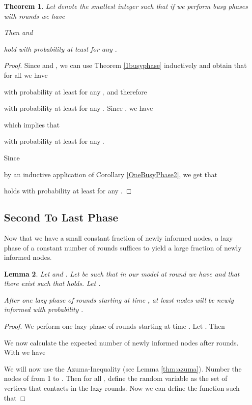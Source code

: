 \documentclass[12pt]{article}
\newtheorem{theorem}{Theorem}
\newtheorem{lemma}[theorem]{Lemma}
\begin{document}
{\begin{theorem}
Let  denote the smallest integer such that if we perform  busy phases with  rounds we have 

Then 
and

hold with probability at least  for any .
\end{theorem}

\begin{proof} 
Since  and , we can use Theorem \ref{1busyphase} inductively and obtain that for all  we have


with probability at least  for any , and therefore


with probability at least  for any .
Since , we have

which implies that

with probability at least  for any .

Since

by an inductive application of Corollary \ref{OneBusyPhase2}, we get that 

holds with probability at least  for any .
\end{proof}



\subsection{Second To Last Phase}

Now that we have a small constant fraction of newly informed nodes, a lazy phase of a constant number of rounds suffices to yield a large fraction of newly informed nodes.

\begin{lemma}\label{LazyPhase3}
Let  and .
Let  be such that in our model at round  we have 
and that there exist  such that
  holds.
Let .

 After one lazy phase of  rounds starting at time , at least  nodes will be newly informed with probability .
\end{lemma}
\begin{proof}
We perform one lazy phase of  rounds starting at time . Let . Then


We now calculate the expected number of newly informed nodes after  rounds. With  we have




We will now use the Azuma-Inequality (see Lemma
\ref{thm:azuma}). Number the nodes of  from 1 to . 
Then for all , define the random variable  as the set of vertices that  contacts in the  lazy rounds. 
Now we can define the function  such that





\end{proof}}
\end{document}
